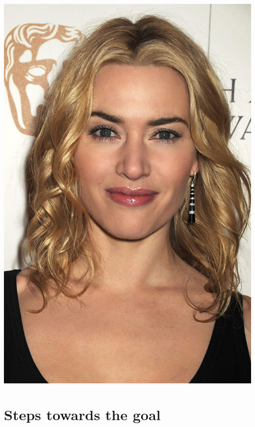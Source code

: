 \documentclass{article}
\begin{document}
\begin{center}
\begin{multicols}{2}
\includegraphics[scale=0.07]{intro2.jpeg}  
\end{multicols}
\end{center}
\vspace*{0.2in}

\section{Steps towards the goal}
\end{document}
